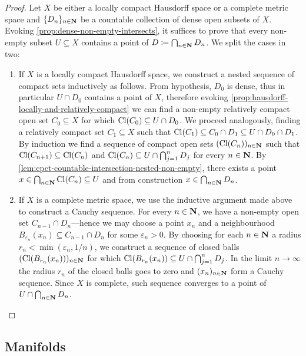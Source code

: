 \begin{proof}
Let \(X\) be either a locally compact Hausdorff space or a complete metric space
and \(\{D_n\}_{n \in \mathbf{N}}\) be a countable collection of dense open subsets of
\(X\). Evoking \cref{prop:dense-non-empty-intersects}, it suffices to prove that
every non-empty subset \(U \subseteq X\) contains a point of
\(D \coloneq \bigcap_{n \in \mathbf{N}} D_n\). We split the cases in two:
\begin{enumerate}\setlength\itemsep{0em}
\item If \(X\) is a locally compact Hausdorff space, we construct a nested
  sequence of compact sets inductively as follows. From hypothesis, \(D_0\) is
  dense, thus in particular \(U \cap D_0\) contains a point of \(X\), therefore
  evoking \cref{prop:hausdorff-locally-and-relatively-compact} we can find a
  non-empty relatively compact open set \(C_0 \subseteq X\) for which
  \(\operatorname{Cl}(C_0) \subseteq U \cap D_0\). We proceed analogously, finding a
  relatively compact set \(C_1 \subseteq X\) such that
  \(\operatorname{Cl}(C_1) \subseteq C_0 \cap D_1 \subseteq U \cap D_0 \cap D_1\). By
  induction we find a sequence of compact open sets \((\operatorname{Cl}(C_n))_{n \in \mathbf{N}}\)
  such that \(\operatorname{Cl}(C_{n+1}) \subseteq \operatorname{Cl}(C_{n})\) and
  \(\operatorname{Cl}(C_n) \subseteq U \cap \bigcap_{j=1}^n D_j\) for every \(n \in \mathbf{N}\). By
  \cref{lem:cpct-countable-intersection-nested-non-empty}, there exists a point
  \(x \in \bigcap_{n \in \mathbf{N}} \operatorname{Cl}(C_n) \subseteq U\) and from construction
  \(x \in \bigcap_{n \in \mathbf{N}} D_n\).

\item If \(X\) is a complete metric space, we use the inductive argument made
  above to construct a Cauchy sequence. For every \(n \in \mathbf{N}\), we have a
  non-empty open set \(C_{n-1} \cap D_n\)---hence we may choose a point
  \(x_n\) and a neighbourhood
  \(B_{\varepsilon_n}(x_n) \subseteq C_{n-1} \cap D_n\) for some
  \(\varepsilon_n > 0\). By choosing for each \(n \in \mathbf{N}\) a radius
  \(r_n < \min(\varepsilon_n, 1/n)\), we construct a sequence of closed balls
  \((\operatorname{Cl}(B_{r_n}(x_n)))_{n \in \mathbf{N}}\) for which
  \(\operatorname{Cl}(B_{r_n}(x_n)) \subseteq U \cap \bigcap_{j=1}^n D_j\). In the limit
  \(n \to \infty\) the radius \(r_n\) of the closed balls goes to zero and
  \((x_n)_{n \in \mathbf{N}}\) form a Cauchy sequence. Since \(X\) is complete, such
  sequence converges to a point of \(U \cap \bigcap_{n \in \mathbf{N}} D_n\).
\end{enumerate}
\end{proof}

\subsection{Manifolds}

